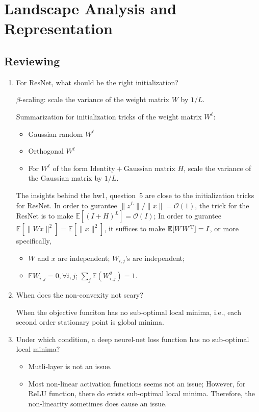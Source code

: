 \chapter{Landscape Analysis and Representation}


\section{Reviewing}
\begin{enumerate}
\item
For ResNet, what should be the right initialization?

$\beta$-scaling: scale the variance of the weight matrix $W$ by $1/L$.
\begin{remark}
Summarization for initialization tricks of the weight matrix $W^{\ell}$:
\begin{itemize}
\item
Gaussian random $W^{\ell}$
\item
Orthogonal $W^{\ell}$
\item
For $W^{\ell}$ of the form $\text{Identity}+\text{Gaussian matrix }H$, scale the variance of the Gaussian matrix by $1/L$.
\end{itemize}
\end{remark}
\begin{remark}
The insights behind the hw1, question~5 are close to the initialization tricks for ResNet.
In order to gurantee $\|z^{L}\|/\|x\|=\mathcal{O}(1)$, the trick for the ResNet is to make $\mathbb{E}[(I+H)^L]=\mathcal{O}(I)$;
In order to gurantee $\mathbb{E}[\|Wx\|^2]=\mathbb{E}[\|x\|^2]$, it suffices to make $\mathbb{E}[WW^{\mathrm T}]=I$, or more specifically, 
\begin{itemize}
\item
$W$ and $x$ are independent;
$W_{i,j}$'s are independent;
\item
$\mathbb{E}W_{i,j}=0,\forall i,j$;
$\sum_j\mathbb{E}(W_{i,j}^2)=1$.
\end{itemize}

\end{remark}
\item
When does the non-convexity not scary?

When the objective funciton has no sub-optimal local minima, i.e., 
each second order stationary point is global minima.
\item
Under which condition, 
a deep neurel-net loss function has no sub-optimal local minima?
\begin{itemize}
\item
Mutli-layer is not an issue.
\item
Most non-linear activation functions seems not an issue;
However, for ReLU function, there do exists sub-optimal local minima.
Therefore, the non-linearity sometimes does cause an issue.
\end{itemize}

\end{enumerate}

